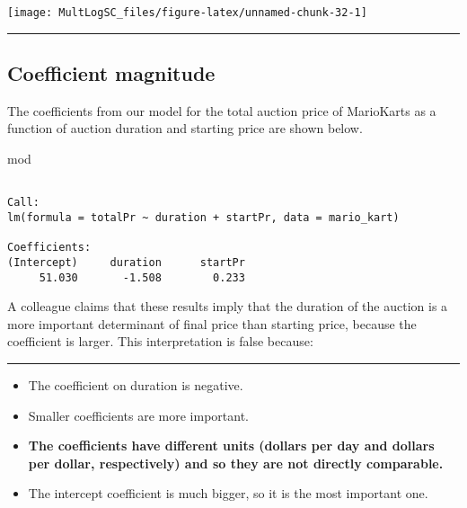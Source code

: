 \documentclass[]{book}
\newenvironment{Shaded}{\begin{snugshade}}{\end{snugshade}}
\newcommand{\NormalTok}[1]{#1}
\begin{document}
\begin{center}\texttt{[image: MultLogSC\_files/figure-latex/unnamed-chunk-32-1]} \end{center}

\begin{center}\rule{0.5\linewidth}{\linethickness}\end{center}

\subsection*{Coefficient magnitude}\label{coefficient-magnitude}

The coefficients from our model for the total auction price of
MarioKarts as a function of auction duration and starting price are
shown below.

\begin{Shaded}
\begin{Highlighting}[]
\NormalTok{mod}
\end{Highlighting}
\end{Shaded}

\begin{verbatim}

Call:
lm(formula = totalPr ~ duration + startPr, data = mario_kart)

Coefficients:
(Intercept)     duration      startPr  
     51.030       -1.508        0.233  
\end{verbatim}

A colleague claims that these results imply that the duration of the
auction is a more important determinant of final price than starting
price, because the coefficient is larger. This interpretation is false
because:

\begin{center}\rule{0.5\linewidth}{\linethickness}\end{center}

\begin{itemize}
\item
  The coefficient on duration is negative.
\item
  Smaller coefficients are more important.
\item
  \textbf{The coefficients have different units (dollars per day and
  dollars per dollar, respectively) and so they are not directly
  comparable.}
\item
  The intercept coefficient is much bigger, so it is the most important
  one.
\end{itemize}
\end{document}
